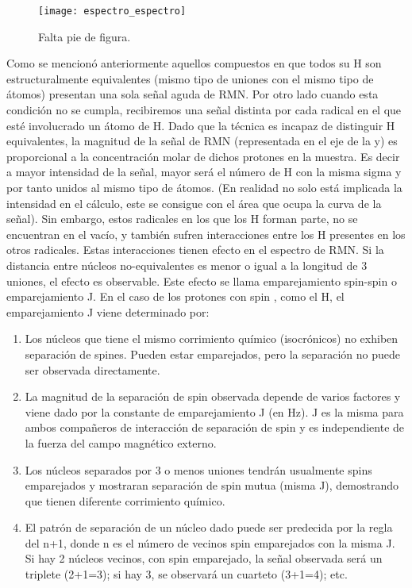 \begin{figure}[htb]
 \begin{figg}
   \texttt{[image: espectro\_espectro]}
   \caption{Falta pie de figura.}
 \label{fig:espectro_espectro}
 \end{figg}
\end{figure}


Como se mencionó anteriormente aquellos compuestos en que todos su H son estructuralmente equivalentes (mismo tipo de uniones con el mismo tipo de átomos) presentan una sola señal aguda de RMN. Por otro lado cuando esta condición no se cumpla, recibiremos una señal distinta por cada radical en el que esté involucrado un átomo de H. Dado que la técnica es incapaz de distinguir H equivalentes, la magnitud de la señal de RMN (representada en el eje de la y) es proporcional a la concentración molar de dichos protones en la muestra. Es decir a mayor intensidad de la señal, mayor será el número de H con la misma sigma y por tanto unidos al mismo tipo de átomos. (En realidad no solo está implicada la intensidad en el cálculo, este se consigue con el área que ocupa la curva de la señal).  Sin embargo, estos radicales en los que los H forman parte, no se encuentran en el vacío, y también sufren interacciones entre los H presentes en los otros radicales.
Estas interacciones tienen efecto en el espectro de RMN. Si la distancia entre núcleos no-equivalentes es menor  o igual a la longitud de 3 uniones, el efecto es observable. Este efecto se llama emparejamiento spin-spin  o emparejamiento J. En el caso de los protones con spin  , como el H, el emparejamiento J viene determinado por:

\begin{enumerate}
 \item Los núcleos que tiene el mismo corrimiento químico (isocrónicos) no exhiben separación de spines. Pueden estar emparejados, pero la separación no puede ser observada directamente.
 \item La magnitud de la separación de spin observada  depende de varios factores y viene dado por la constante de emparejamiento J (en Hz). J es la misma para ambos compañeros de interacción de separación de spin y es independiente de la fuerza del campo magnético externo.
 \item Los núcleos separados por 3 o menos uniones tendrán usualmente spins emparejados y mostraran separación de spin mutua (misma J), demostrando que tienen diferente corrimiento químico.
 \item El patrón de separación de un núcleo dado puede ser predecida por la regla del n+1, donde n es el número de vecinos spin emparejados con la misma J. Si hay 2 núcleos vecinos, con spin emparejado, la señal observada será un triplete (2+1=3); si hay 3, se observará un cuarteto (3+1=4); etc.
\end{enumerate}


